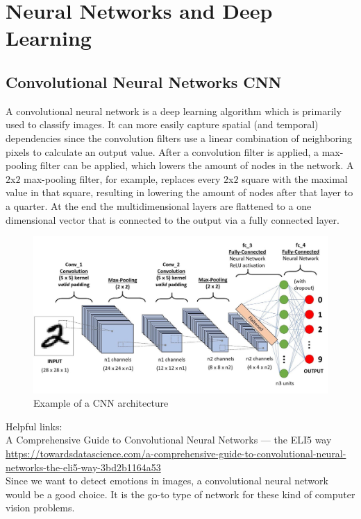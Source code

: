\section{Neural Networks and Deep Learning}


\subsection{Convolutional Neural Networks CNN}

A convolutional neural network is a deep learning algorithm which is primarily used to classify images. It can more easily capture spatial (and temporal) dependencies since the convolution filters use a linear combination of neighboring pixels to calculate an output value. After a convolution filter is applied, a max-pooling filter can be applied, which lowers the amount of nodes in the network. A $2$x$2$ max-pooling filter, for example, replaces every $2$x$2$ square with the maximal value in that square, resulting in lowering the amount of nodes after that layer to a quarter.
At the end the multidimensional layers are flattened to a one dimensional vector that is connected to the output via a fully connected layer.

\begin{figure}[hbtp]
	\centering
	\includegraphics[width=1\textwidth]{Images/CNN}
	\caption{Example of a CNN architecture}
\end{figure}

Helpful links:\\
A Comprehensive Guide to Convolutional Neural Networks — the ELI5 way
\\
\url{https://towardsdatascience.com/a-comprehensive-guide-to-convolutional-neural-networks-the-eli5-way-3bd2b1164a53}
\\

Since we want to detect emotions in images, a convolutional neural network would be a good choice. It is the go-to type of network for these kind of computer vision problems.

